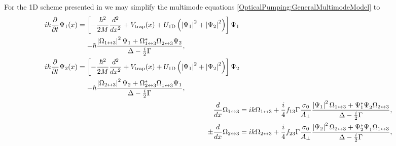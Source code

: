 For the 1D scheme presented in  we may simplify the multimode equations \eqref{OpticalPumping:GeneralMultimodeModel} to
\begin{subequations}
    \label{OpticalPumping:OverlappingCondensatesEvolution}
    \begin{align}
        \begin{split}
            i \hbar \frac{\partial}{\partial t} \Psi_1(x) &= \left[- \frac{\hbar^2}{2M}\frac{d^2}{dx^2} + V_\text{trap}(x) + U_\text{1D}\left(\abs{\Psi_1}^2 + \abs{\Psi_2}^2\right)  \right] \Psi_1\\
            &\relphantom{=} - \hbar \frac{\abs{\Omega_{1\leftrightarrow 3}}^2\Psi_1 + \Omega_{1\leftrightarrow 3}^* \Omega_{2\leftrightarrow 3}^{\phantom{*}}\Psi_2}{\Delta - \frac{i}{2} \Gamma},
        \end{split} \label{OpticalPumping:OverlappingCondensatesEvolution:Psi1}\\
        \begin{split}
            i \hbar \frac{\partial}{\partial t} \Psi_2(x) &= \left[- \frac{\hbar^2}{2M}\frac{d^2}{dx^2} + V_\text{trap}(x) + U_\text{1D}\left(\abs{\Psi_1}^2 + \abs{\Psi_2}^2\right)  \right] \Psi_2\\
            &\relphantom{=} - \hbar \frac{\abs{\Omega_{2\leftrightarrow 3}}^2 \Psi_2 + \Omega_{2\leftrightarrow 3}^* \Omega_{1\leftrightarrow 3}^{\phantom{*}} \Psi_1}{\Delta - \frac{i}{2} \Gamma},
        \end{split} \label{OpticalPumping:OverlappingCondensatesEvolution:Psi2}\\
        \frac{d}{dx} \Omega_{1\leftrightarrow 3} &= i k \Omega_{1\leftrightarrow 3} + \frac{i}{4} f_{13} \Gamma \frac{\sigma_0}{A_\perp} \frac{\abs{\Psi_1}^2 \Omega_{1\leftrightarrow 3} + \Psi_1^* \Psi_2^{\phantom{*}}\Omega_{2\leftrightarrow 3}}{\Delta - \frac{i}{2} \Gamma}, \label{OpticalPumping:OverlappingCondensatesEvolution:Omega1}\\
        \pm \frac{d}{dx} \Omega_{2\leftrightarrow 3} &= i k \Omega_{2\leftrightarrow 3} + \frac{i}{4} f_{23} \Gamma \frac{\sigma_0}{A_\perp} \frac{\abs{\Psi_2}^2 \Omega_{2\leftrightarrow 3} + \Psi_2^* \Psi_1^{\phantom{*}} \Omega_{1\leftrightarrow 3}}{\Delta - \frac{i}{2} \Gamma}, \label{OpticalPumping:OverlappingCondensatesEvolution:Omega2}
    \end{align}
\end{subequations}
